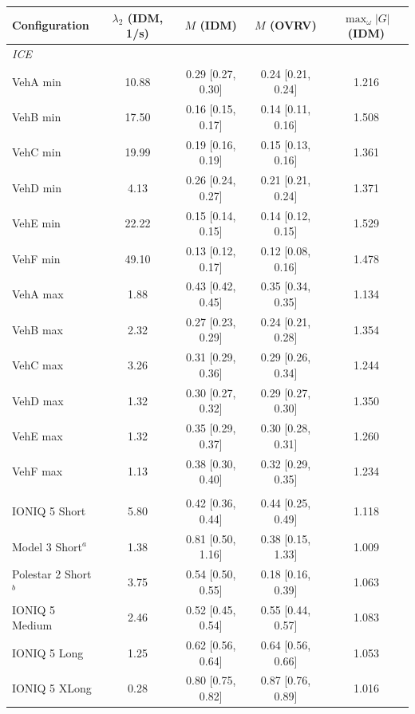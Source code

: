 \begin{tabular}{lcccc}
\toprule
Configuration & $\lambda_2$ (IDM, 1/s) & $M$ (IDM) & $M$ (OVRV) & $\max_\omega |G|$ (IDM) \\
\midrule
\multicolumn{5}{l}{\textit{ICE}} \\
\quad VehA min & 10.88 & 0.29 [0.27, 0.30] & 0.24 [0.21, 0.24] & 1.216 \\
\quad VehB min & 17.50 & 0.16 [0.15, 0.17] & 0.14 [0.11, 0.16] & 1.508 \\
\quad VehC min & 19.99 & 0.19 [0.16, 0.19] & 0.15 [0.13, 0.16] & 1.361 \\
\quad VehD min & 4.13 & 0.26 [0.24, 0.27] & 0.21 [0.21, 0.24] & 1.371 \\
\quad VehE min & 22.22 & 0.15 [0.14, 0.15] & 0.14 [0.12, 0.15] & 1.529 \\
\quad VehF min & 49.10 & 0.13 [0.12, 0.17] & 0.12 [0.08, 0.16] & 1.478 \\
\quad VehA max & 1.88 & 0.43 [0.42, 0.45] & 0.35 [0.34, 0.35] & 1.134 \\
\quad VehB max & 2.32 & 0.27 [0.23, 0.29] & 0.24 [0.21, 0.28] & 1.354 \\
\quad VehC max & 3.26 & 0.31 [0.29, 0.36] & 0.29 [0.26, 0.34] & 1.244 \\
\quad VehD max & 1.32 & 0.30 [0.27, 0.32] & 0.29 [0.27, 0.30] & 1.350 \\
\quad VehE max & 1.32 & 0.35 [0.29, 0.37] & 0.30 [0.28, 0.31] & 1.260 \\
\quad VehF max & 1.13 & 0.38 [0.30, 0.40] & 0.32 [0.29, 0.35] & 1.234 \\
\addlinespace
\multicolumn{5}{l}{\textit{EV}} \\
\quad IONIQ 5 Short & 5.80 & 0.42 [0.36, 0.44] & 0.44 [0.25, 0.49] & 1.118 \\
\quad Model 3 Short$^{a}$ & 1.38 & 0.81 [0.50, 1.16] & 0.38 [0.15, 1.33] & 1.009 \\
\quad Polestar 2 Short$^{b}$ & 3.75 & 0.54 [0.50, 0.55] & 0.18 [0.16, 0.39] & 1.063 \\
\quad IONIQ 5 Medium & 2.46 & 0.52 [0.45, 0.54] & 0.55 [0.44, 0.57] & 1.083 \\
\quad IONIQ 5 Long & 1.25 & 0.62 [0.56, 0.64] & 0.64 [0.56, 0.66] & 1.053 \\
\quad IONIQ 5 XLong & 0.28 & 0.80 [0.75, 0.82] & 0.87 [0.76, 0.89] & 1.016 \\
\bottomrule
\end{tabular}

